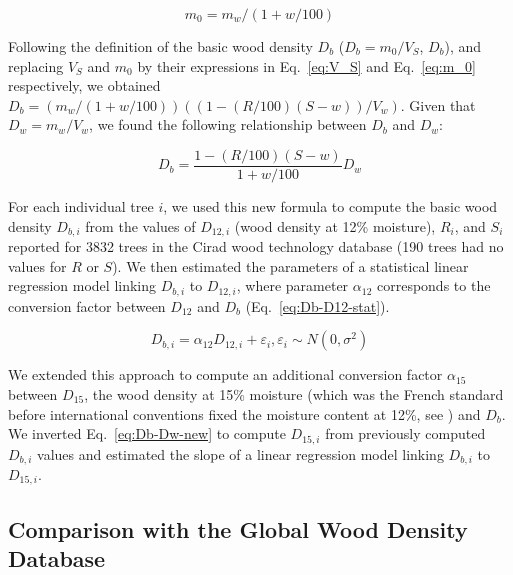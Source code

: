 \documentclass[a4paper, 12pt, leqno, dvipsnames]{article}\usepackage[]{graphicx}\usepackage[]{color}
\begin{document}
\begin{equation}
  m_0=m_w/(1+w/100)
  \label{eq:m_0}
\end{equation}

Following the definition of the basic wood density $D_b$ ($D_b=m_0/V_S$, $D_b$), and replacing $V_S$ and $m_0$ by their expressions in Eq.~\ref{eq:V_S} and Eq.~\ref{eq:m_0} respectively, we obtained $D_b=(m_w/(1+w/100))((1-(R/100)(S-w))/V_w)$. Given that $D_w=m_w/V_w$, we found the following relationship between $D_b$ and $D_w$:

\begin{equation}
  D_b=\frac{1-(R/100)(S-w)}{1+w/100}D_w
  \label{eq:Db-Dw-new}
\end{equation}

For each individual tree $i$, we used this new formula to compute the basic wood density $D_{b,i}$ from the values of $D_{12,i}$ (wood density at 12\% moisture), $R_i$, and $S_i$ reported for 3832 trees in the Cirad wood technology database (190 trees had no values for $R$ or $S$). We then estimated the parameters of a statistical linear regression model linking $D_{b,i}$ to $D_{12,i}$, where parameter $\alpha_{12}$ corresponds to the conversion factor between $D_{12}$ and $D_b$ (Eq.~\ref{eq:Db-D12-stat}).

\begin{equation}
  D_{b,i}=\alpha_{12} D_{12,i} + \varepsilon_i, \varepsilon_i \sim N(0,\sigma^2)
  \label{eq:Db-D12-stat}
\end{equation}

We extended this approach to compute an additional conversion factor $\alpha_{15}$ between $D_{15}$, the wood density at 15\% moisture (which was the French standard before international conventions fixed the moisture content at 12\%, see \citet{Sallenave1955}) and $D_b$. We inverted Eq.~\ref{eq:Db-Dw-new} to compute $D_{15,i}$ from previously computed $D_{b,i}$ values and estimated the slope of a linear regression model linking $D_{b,i}$ to $D_{15,i}$.

\subsection{Comparison with the Global Wood Density Database}
\end{document}

